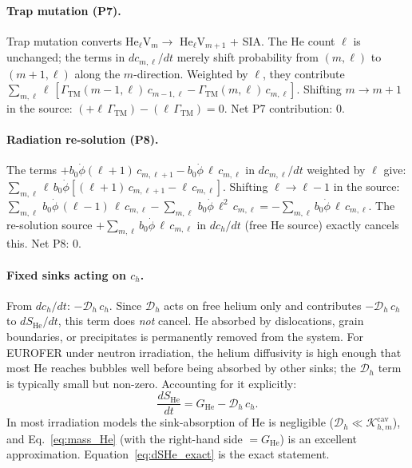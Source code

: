 \paragraph{Trap mutation (P7).}
Trap mutation converts He$_\ell$V$_m \to$ He$_\ell$V$_{m+1}$ + SIA. The
He count $\ell$ is unchanged; the terms in $dc_{m,\ell}/dt$ merely shift
probability from $(m,\ell)$ to $(m+1,\ell)$ along the $m$-direction.
Weighted by $\ell$, they contribute $\sum_{m,\ell}\ell\,[\Gamma_{\mathrm{TM}}
(m{-}1,\ell)\,c_{m-1,\ell} - \Gamma_{\mathrm{TM}}(m,\ell)\,c_{m,\ell}]$.
Shifting $m \to m+1$ in the source: $(+\ell\,\Gamma_{\mathrm{TM}}) -
(\ell\,\Gamma_{\mathrm{TM}}) = 0$. Net P7 contribution: $0$. \checkmark

\paragraph{Radiation re-solution (P8).}
The terms $+b_0\dot{\phi}(\ell{+}1)\,c_{m,\ell+1} - b_0\dot{\phi}\,\ell\,
c_{m,\ell}$ in $dc_{m,\ell}/dt$ weighted by $\ell$ give:
$\sum_{m,\ell}\ell\,b_0\dot{\phi}[(\ell{+}1)\,c_{m,\ell+1}
- \ell\,c_{m,\ell}]$. Shifting $\ell \to \ell-1$ in the source:
$\sum_{m,\ell}\,b_0\dot{\phi}\,(\ell{-}1)\,\ell\,c_{m,\ell}
- \sum_{m,\ell}\,b_0\dot{\phi}\,\ell^2\,c_{m,\ell} = -\sum_{m,\ell}
b_0\dot{\phi}\,\ell\,c_{m,\ell}$.
The re-solution source $+\sum_{m,\ell}b_0\dot{\phi}\,\ell\,c_{m,\ell}$
in $dc_h/dt$ (free He source) exactly cancels this. Net P8: $0$. \checkmark

\paragraph{Fixed sinks acting on $c_h$.}
From $dc_h/dt$: $-\mathcal{D}_h\,c_h$. Since $\mathcal{D}_h$ acts on free
helium only and contributes $-\mathcal{D}_h\,c_h$ to $dS_{\mathrm{He}}/dt$,
this term does \emph{not} cancel. He absorbed by dislocations,
grain boundaries, or precipitates is permanently removed from the system.
For EUROFER under neutron irradiation, the helium diffusivity is high
enough that most He reaches bubbles well before being absorbed by other
sinks; the $\mathcal{D}_h$ term is typically small but non-zero.
Accounting for it explicitly:
\begin{equation}\label{eq:dSHe_exact}
\boxed{
    \frac{dS_{\mathrm{He}}}{dt}
    = G_{\mathrm{He}} - \mathcal{D}_h\,c_h.
}
\end{equation}
In most irradiation models the sink-absorption of He is negligible
($\mathcal{D}_h \ll \mathcal{K}_{h,m}^{\mathrm{cav}}$), and
Eq.~\eqref{eq:mass_He} (with the right-hand side $= G_{\mathrm{He}}$) is
an excellent approximation. Equation~\eqref{eq:dSHe_exact} is the exact
statement.

